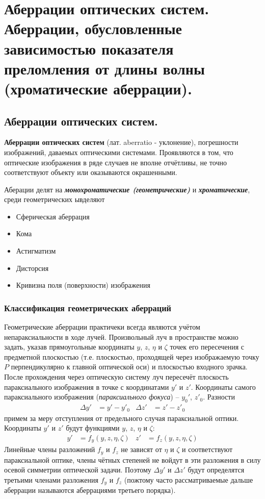 \section{Аберрации оптических систем. Аберрации, обусловленные зависимостью показателя преломления от длины волны (хроматические аберрации).}
\subsection{Аберрации оптических систем.}
\begin{definition}
	\textbf{Аберрации оптических систем} (лат. aberratio - уклонение),
	погрешности изображений, даваемых оптическими системами.
	Проявляются в том, что оптические изображения в ряде случаев не
	вполне отчётливы, не точно соответствуют объекту или оказываются
	окрашенными.
\end{definition}
Аберации делят на \textbf{\textit{монохроматические (геометрические)}} и \textbf{\textit{хроматические}}, среди геометрических ывделяют
\begin{itemize}
	\item Сферическая аберрация
	\item Кома
	\item Астигматизм
	\item Дисторсия 
	\item Кривизна поля (поверхности) изображения
\end{itemize}
\subsubsection{Классификация геометрических аберраций}
Геометрические аберрации практичеки всегда являются учётом непараксиальности в ходе лучей. Произвольный луч в пространстве можно задать, указав прямоугольные координаты $y$, $z$, $\eta$ и $\zeta$ точек его пересечения с  предметной плоскостью (т.е. плоскостью, проходящей через изображаемую точку $P$ перпендикулярно к главной оптической оси) и плоскостью входного зрачка. После прохождения через оптическую систему луч пересечёт плоскость параксиального изображения в точке с координатами $y'$ и $z'$. Координаты самого параксиального изображения (\textit{параксиального фокуса}) -- $y_{0}'$, $z'_{0}$. Разности
\begin{align*}
\Delta y' &= y' - y'_{0} & \Delta z' &= z'- z'_{0}
\end{align*} 
примем за меру отступления от предельного случая параксиальной оптики.
Координаты $y'$  и  $z'$ будут функциями $y$, $z$, $\eta$ и $\zeta$:
\begin{align*}
y' &= f_{y}(y,z,\eta,\zeta) & z' &= f_{z}(y,z,\eta,\zeta)
\end{align*}
Линейные члены разложений $f_{y}$ и $f_{z}$ не зависят от $\eta$ и $\zeta$ и соответствуют параксиальной оптике, члены чётных степеней не войдут в эти разложения в силу осевой симметрии оптической задачи. Поэтому $\Delta y'$ и $\Delta z'$ будут определятся третьими членами разложения $f_{y}$ и $f_{z}$ (пожтому часто рассматриваемые дальше аберрации называются аберрациями третьего порядка).

